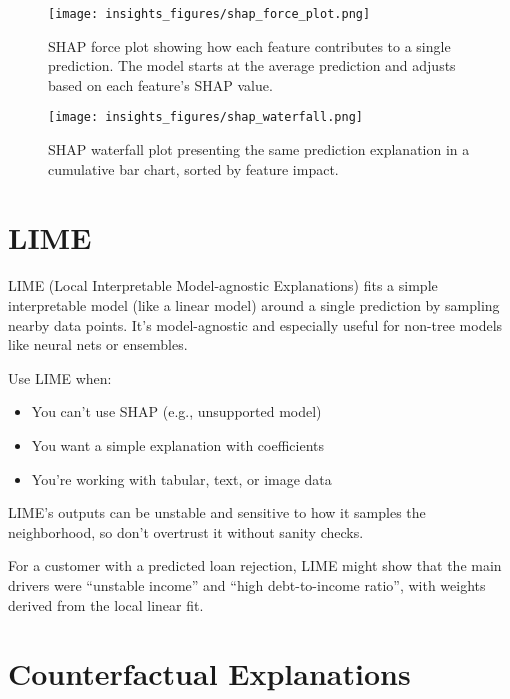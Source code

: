 \documentclass[12pt,openany]{book}
\begin{document}
\begin{figure}[H]
    \centering
    \texttt{[image: insights\_figures/shap\_force\_plot.png]}
    \caption{SHAP force plot showing how each feature contributes to a single prediction. The model starts at the average prediction and adjusts based on each feature’s SHAP value.}
    \label{fig:shap-force}
\end{figure}

\begin{figure}[H]
    \centering
    \texttt{[image: insights\_figures/shap\_waterfall.png]}
    \caption{SHAP waterfall plot presenting the same prediction explanation in a cumulative bar chart, sorted by feature impact.}
    \label{fig:shap-waterfall}
\end{figure}




\section{LIME}

LIME (Local Interpretable Model-agnostic Explanations) fits a simple interpretable model (like a linear model) around a single prediction by sampling nearby data points. It’s model-agnostic and especially useful for non-tree models like neural nets or ensembles.

Use LIME when:
\begin{itemize}
  \item You can’t use SHAP (e.g., unsupported model)
  \item You want a simple explanation with coefficients
  \item You’re working with tabular, text, or image data
\end{itemize}

\begin{notebox}
LIME’s outputs can be unstable and sensitive to how it samples the neighborhood, so don’t overtrust it without sanity checks.
\end{notebox}

\begin{examplebox}
For a customer with a predicted loan rejection, LIME might show that the main drivers were ``unstable income'' and ``high debt-to-income ratio'', with weights derived from the local linear fit.
\end{examplebox}

\section{Counterfactual Explanations}
\end{document}
